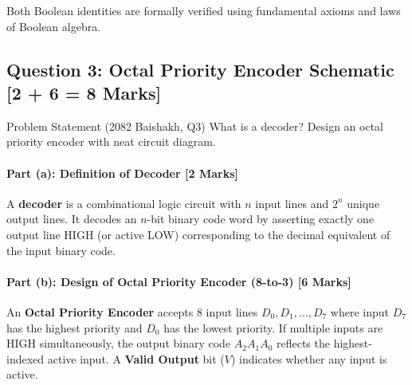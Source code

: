 \documentclass[11pt,a4paper,oneside]{book}
\begin{document}
\begin{answerbox}
Both Boolean identities are formally verified using fundamental axioms and laws of Boolean algebra.
\end{answerbox}

\vspace{0.6cm}

\subsection{Question 3: Octal Priority Encoder Schematic [2 + 6 = 8 Marks]}
\begin{questionbox}{Problem Statement (2082 Baishakh, Q3)}
What is a decoder? Design an octal priority encoder with neat circuit diagram.
\end{questionbox}

\paragraph{Part (a): Definition of Decoder [2 Marks]}
A \textbf{decoder} is a combinational logic circuit with $n$ input lines and $2^n$ unique output lines. It decodes an $n$-bit binary code word by asserting exactly one output line HIGH (or active LOW) corresponding to the decimal equivalent of the input binary code.

\paragraph{Part (b): Design of Octal Priority Encoder (8-to-3) [6 Marks]}
An \textbf{Octal Priority Encoder} accepts 8 input lines $D_0, D_1, \dots, D_7$ where input $D_7$ has the highest priority and $D_0$ has the lowest priority. If multiple inputs are HIGH simultaneously, the output binary code $A_2 A_1 A_0$ reflects the highest-indexed active input. A \textbf{Valid Output} bit ($V$) indicates whether any input is active.
\end{document}
